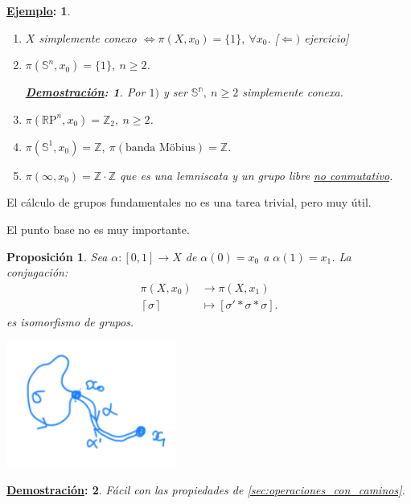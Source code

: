 \documentclass[10pt,a4paper,openright]{book}
\theoremstyle{break}
\newtheorem*{prop}{Proposición}
\newtheorem*{demo}{\underline{Demostración}:}
\newtheorem*{ej}{\underline{Ejemplo}:}
\begin{document}
\begin{ej}
\begin{enumerate}
    \item $X$ simplemente conexo $\Leftrightarrow \pi\left( X, x_0 \right) = \{1\},\ \forall x_0$. [$\Leftarrow)$ ejercicio]
    \item $\pi\left( \mathbb{S}^n, x_0 \right) = \{1\},\ n \ge 2$.
    \begin{demo}
    Por $1)$ y ser $\mathbb{S^n},\ n \ge 2$ simplemente conexa.
    \end{demo}
    \item $\pi\left( \mathbb{R}\mathrm{P}^n, x_0 \right) = \mathbb{Z}_2,\ n \ge 2$.
    \item $\pi\left( \mathbb{S}^1, x_0 \right) = \mathbb{Z},\ \pi\left( \text{banda Möbius} \right) = \mathbb{Z}$.
    \item $\pi\left( \infty, x_0 \right) = \mathbb{Z} \cdot \mathbb{Z}$ que es una lemniscata y un grupo libre \underline{no conmutativo}.
\end{enumerate}
\end{ej}
El cálculo de grupos fundamentales no es una tarea trivial, pero muy útil.

El punto base no es muy importante.
\begin{prop}
Sea $\alpha: \left[ 0, 1 \right] \rightarrow X$ de $\alpha\left( 0 \right) = x_0$ a $\alpha\left( 1 \right) = x_1$. La conjugación:
\begin{align*}
    \pi\left( X, x_0 \right) &\rightarrow \pi\left( X, x_1 \right)\\
    \left\lceil \sigma \right\rceil &\mapsto \left[ \sigma' * \sigma * \sigma \right] 
.\end{align*}
es isomorfismo de grupos.
\begin{center}
    \includegraphics[scale=0.3]{images/conj_iso_grupos} 
\end{center}
\end{prop}
\begin{demo}
Fácil con las propiedades de \ref{sec:operaciones_con_caminos}.
\end{demo}
\end{document}
